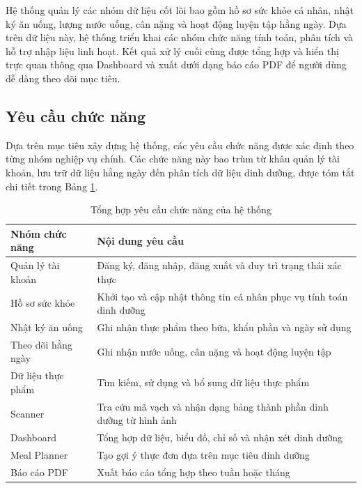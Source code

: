\documentclass[12pt, a4paper]{report}
\begin{document}
Hệ thống quản lý các nhóm dữ liệu cốt lõi bao gồm hồ sơ sức khỏe cá nhân, nhật ký ăn uống, lượng nước uống, cân nặng và hoạt động luyện tập hằng ngày. Dựa trên dữ liệu này, hệ thống triển khai các nhóm chức năng tính toán, phân tích và hỗ trợ nhập liệu linh hoạt. Kết quả xử lý cuối cùng được tổng hợp và hiển thị trực quan thông qua Dashboard và xuất dưới dạng báo cáo PDF để người dùng dễ dàng theo dõi mục tiêu.

\subsection{Yêu cầu chức năng}
Dựa trên mục tiêu xây dựng hệ thống, các yêu cầu chức năng được xác định theo từng nhóm nghiệp vụ chính. Các chức năng này bao trùm từ khâu quản lý tài khoản, lưu trữ dữ liệu hằng ngày đến phân tích dữ liệu dinh dưỡng, được tóm tắt chi tiết trong Bảng \ref{tab:tong_hop_chuc_nang}.

\begin{table}[htbp]
    \centering
    \caption{Tổng hợp yêu cầu chức năng của hệ thống}
\label{tab:tong_hop_chuc_nang}
    \vspace{4pt}
    \renewcommand{\arraystretch}{1.3}
    \begin{tabular}{|>{\raggedright\arraybackslash}p{4cm}|p{11cm}|}
        \hline
        \textbf{Nhóm chức năng} & \textbf{Nội dung yêu cầu} \\
        \hline
        Quản lý tài khoản & Đăng ký, đăng nhập, đăng xuất và duy trì trạng thái xác thực \\
        \hline
        Hồ sơ sức khỏe & Khởi tạo và cập nhật thông tin cá nhân phục vụ tính toán dinh dưỡng \\
        \hline
        Nhật ký ăn uống & Ghi nhận thực phẩm theo bữa, khẩu phần và ngày sử dụng \\
        \hline
        Theo dõi hằng ngày & Ghi nhận nước uống, cân nặng và hoạt động luyện tập \\
        \hline
        Dữ liệu thực phẩm & Tìm kiếm, sử dụng và bổ sung dữ liệu thực phẩm \\
        \hline
        Scanner & Tra cứu mã vạch và nhận dạng bảng thành phần dinh dưỡng từ hình ảnh \\
        \hline
        Dashboard & Tổng hợp dữ liệu, biểu đồ, chỉ số và nhận xét dinh dưỡng \\
        \hline
        Meal Planner & Tạo gợi ý thực đơn dựa trên mục tiêu dinh dưỡng \\
        \hline
        Báo cáo PDF & Xuất báo cáo tổng hợp theo tuần hoặc tháng \\
        \hline
    \end{tabular}
\end{table}
\end{document}
